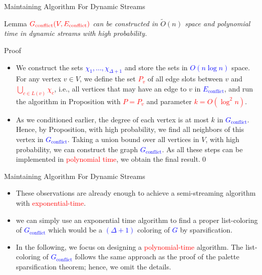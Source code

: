 \documentclass[aspectratio=169,xcolor=dvipsnames]{beamer}
\begin{document}
	\begin{frame}{Maintaining Algorithm For Dynamic Streams}
		\begin{block}{Lemma}
			$\textcolor{red}{G_{\text{conflict}}(V, E_{\text{conflict}})}
			$ \textit{can be constructed in \alert{$\tilde{O}(n)$} space and polynomial time in dynamic streams with high probability.}
		\end{block}
		
		\begin{block}{Proof}
			\begin{itemize}
				\item
				We construct the sets \textcolor{blue}{$\chi_1, \ldots, \chi_{\Delta+1}$} and store the sets in \textcolor{blue}{$O(n \log n)$} space. For any vertex
				$v \in V$, we define the set \textcolor{red}{$P_v$} of all edge slots between $v$ and \textcolor{red}{$\bigcup_{c \in L(v)} \chi_c$}, i.e., all vertices that may
				have an edge to $v$ in \textcolor{blue}{$E_{\text{conflict}}$}, and run the algorithm in Proposition with \textcolor{red}{$P = P_v$} and parameter
				\textcolor{red}{$k = O(\log^2 n)$}.
				
				\item
				As we conditioned earlier, the degree of each vertex is at most $k$ in \textcolor{blue}{$G_{\text{conflict}}$}.
				Hence, by Proposition, with high probability, we find all neighbors of this vertex in \textcolor{blue}{$G_{\text{conflict}}$}.
				Taking a union bound over all vertices in $V$, with high probability, we can construct the graph
				\textcolor{blue}{$G_{\text{conflict}}$}. As all these steps can be implemented in \textcolor{red}{polynomial time}, we obtain the final result.\qed
			\end{itemize}
		\end{block}
	\end{frame}
	
	\begin{frame}{Maintaining Algorithm For Dynamic Streams}
		\begin{itemize}
			\item These observations are already enough to achieve a semi-streaming algorithm with \textcolor{red}{exponential-time}.
			
			\vspace{1.5em}
			\item we can simply use an exponential time algorithm to find
			a proper list-coloring of \textcolor{blue}{$G_{\text{conflict}}$} which would be a \textcolor{blue}{$(\Delta+1)$} coloring of \textcolor{blue}{$G$} by sparsification.
			
			\vspace{1.5em}
			\item In the following, we focus on designing a \textcolor{red}{polynomial-time} algorithm. The list-coloring of \textcolor{blue}{$G_{\text{conflict}}$} follows the same approach as the proof of the palette sparsification theorem; hence, we omit the details.
		\end{itemize}
	\end{frame}
	
\end{document}

